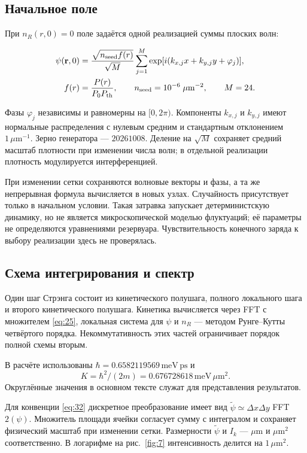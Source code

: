 \documentclass[12pt,a4paper]{article}
\begin{document}
\subsection{Начальное поле}\label{sec:A.1}

При $n_{R}(r,0)=0$ поле задаётся одной реализацией суммы плоских волн:

\[
\begin{aligned}\psi(\mathbf r,0)&=\frac{\sqrt{n_{\rm seed}f(r)}}{\sqrt M}\sum_{j=1}^{M}\exp[i(k_{x,j}x+k_{y,j}y+\varphi_j)],\\f(r)&=\frac{P(r)}{P_0P_{\rm th}},\qquad n_{\rm seed}=10^{-6}\;\mu\mathrm m^{-2},\qquad M=24.\end{aligned}
\]

Фазы $\varphi_{j}$ независимы и равномерны на $[0,2\pi)$. Компоненты $k_{x,j}$ и $k_{y,j}$ имеют нормальные распределения с нулевым средним и стандартным отклонением $1\,\mu\mathrm m^{-1}$. Зерно генератора --- $20261008$. Деление на $\sqrt{M}$ сохраняет средний масштаб плотности при изменении числа волн; в отдельной реализации плотность модулируется интерференцией.

При изменении сетки сохраняются волновые векторы и фазы, а та же непрерывная формула вычисляется в новых узлах. Случайность присутствует только в начальном условии. Такая затравка запускает детерминистскую динамику, но не является микроскопической моделью флуктуаций; её параметры не определяются уравнениями резервуара. Чувствительность конечного заряда к выбору реализации здесь не проверялась.

\subsection{Схема интегрирования и спектр}\label{sec:A.2}

Один шаг Стрэнга состоит из кинетического полушага, полного локального шага и второго кинетического полушага. Кинетика вычисляется через FFT с множителем \eqref{eq:25}, локальная система для $\psi$ и $n_{R}$ --- методом Рунге--Кутты четвёртого порядка. Некоммутативность этих частей ограничивает порядок полной схемы вторым.

В расчёте использованы $\hbar=0.6582119569\,\mathrm{meV}\,\mathrm{ps}$ и
\[
K=\hbar^{2}/(2m)=0.676728618\,\mathrm{meV}\,\mu\mathrm m^{2}.
\] Округлённые значения в основном тексте служат для представления результатов.

Для конвенции \eqref{eq:32} дискретное преобразование имеет вид $\widetilde\psi\simeq \Delta x \Delta y$ FFT$2(\psi)$. Множитель площади ячейки согласует сумму с интегралом и сохраняет физический масштаб при изменении сетки. Размерности $\widetilde\psi$ и $I_{k}$ --- $\mu\mathrm m$ и $\mu\mathrm m^{2}$ соответственно. В логарифме на рис.~\ref{fig:7} интенсивность делится на $1\,\mu\mathrm m^{2}$.
\end{document}

